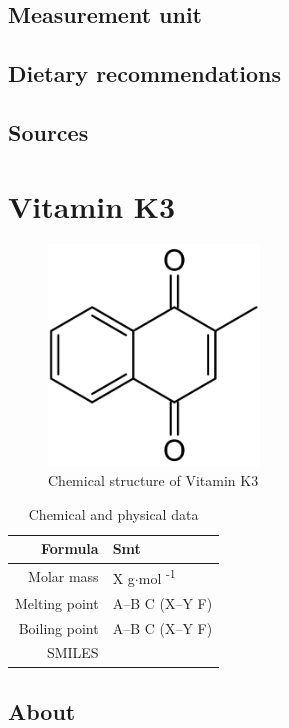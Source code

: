 \documentclass{book}
\begin{document}
\section{Measurement unit}


\section{Dietary recommendations}


\section{Sources}


\chapter{Vitamin K3}
\begin{figure}[h]
	\caption{Chemical structure of Vitamin K3}
	\centering \includegraphics[width=0.5\textwidth]{images/Vitamin_K3_chemical_structure}
\end{figure}

\begin{table}[h]
	\caption{Chemical and physical data}
	\centering \begin{tabular}{| r | l |}
		\hline
		Formula & Smt\\ \hline
		Molar mass & X g$\cdot$mol \textsuperscript{-1}\\ \hline
		Melting point & A--B \degree C (X--Y \degree F)\\ \hline
		Boiling point & A--B \degree C (X--Y \degree F)\\ \hline
		SMILES & \\ \hline
	\end{tabular}
\end{table}
\newpage

\section{About}
\end{document}
